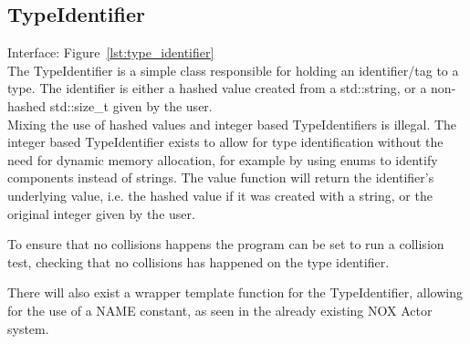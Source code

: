 \subsection{TypeIdentifier}
Interface: Figure~\ref{lst:type_identifier}\\\noindent
The TypeIdentifier is a simple class responsible for holding an identifier/tag to a type. 
The identifier is either a hashed value created from a std::string, or a non-hashed std::size\_t given by the user.\\
Mixing the use of hashed values and integer based TypeIdentifiers is illegal. 
The integer based TypeIdentifier exists to allow for type identification without the need for dynamic
memory allocation, for example by using enums to identify components instead of strings.
The value function will return the identifier's underlying value, i.e. the hashed value if it was created with a string, 
or the original integer given by the user.

To ensure that no collisions happens the program can be set to run a collision test,
checking that no collisions has happened on the type identifier.

There will also exist a wrapper template function for the TypeIdentifier, allowing for the use of a NAME constant, as seen in the already existing NOX Actor system.
